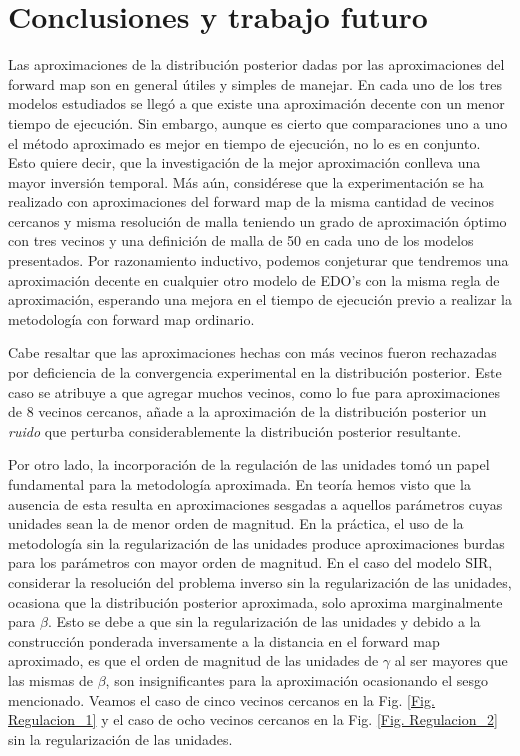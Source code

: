 \chapter{Conclusiones y trabajo futuro}

Las aproximaciones de la distribución posterior dadas por las aproximaciones del forward map son en general útiles y simples de manejar. En cada uno de los tres modelos estudiados se llegó a que existe una aproximación decente con un menor tiempo de ejecución. Sin embargo, aunque es cierto que comparaciones uno a uno el método aproximado es mejor en tiempo de ejecución, no lo es en conjunto. Esto quiere decir, que la investigación de la mejor aproximación conlleva una mayor inversión temporal. 
Más aún, considérese que la experimentación se ha realizado con aproximaciones del forward map de la misma cantidad de vecinos cercanos y misma resolución de malla teniendo un grado de aproximación óptimo con tres vecinos y una definición de malla de 50  en cada uno de los modelos presentados. Por razonamiento inductivo, podemos conjeturar que tendremos una aproximación decente en cualquier otro modelo de EDO's con la misma regla de aproximación, esperando una mejora en el tiempo de ejecución previo a realizar la metodología con forward map ordinario. 

Cabe resaltar que las aproximaciones hechas con más vecinos fueron rechazadas por deficiencia de la convergencia experimental en la distribución posterior. Este caso se atribuye a que agregar muchos vecinos, como lo fue para aproximaciones de $8$ vecinos cercanos, añade a la aproximación de la distribución posterior un \textit{ruido} que perturba considerablemente la distribución posterior resultante.

Por otro lado, la incorporación de la regulación de las unidades tomó un papel fundamental para la metodología aproximada. En teoría hemos visto que la ausencia de esta resulta en aproximaciones sesgadas a aquellos parámetros cuyas unidades sean la de menor orden de magnitud. En la práctica, el uso de la metodología sin la regularización de las unidades produce aproximaciones burdas para los parámetros con mayor orden de magnitud. En el caso del modelo SIR, considerar la resolución del problema inverso sin la regularización de las unidades, ocasiona que la distribución posterior aproximada, solo aproxima marginalmente para $\beta$. Esto se debe a que sin la regularización de las unidades y debido a la construcción ponderada  inversamente a la distancia en el forward map aproximado, es que el orden de magnitud de las unidades de $\gamma$ al ser mayores que las mismas de $\beta$, son insignificantes para la aproximación ocasionando el sesgo mencionado. Veamos el caso de cinco vecinos cercanos en la Fig. \ref{Fig. Regulacion_1}
y el caso de ocho vecinos cercanos en la Fig. \ref{Fig. Regulacion_2} sin la regularización de las unidades.


